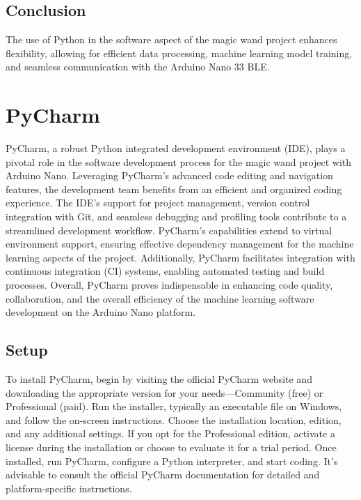 \subsection{Conclusion}
The use of Python in the software aspect of the magic wand project enhances flexibility, allowing for efficient data processing, machine learning model training, and seamless communication with the Arduino Nano 33 BLE.


\section{PyCharm}
\label{Pycharm}
PyCharm, a robust Python integrated development environment (IDE), plays a pivotal role in the software development process for the magic wand project with Arduino Nano. Leveraging PyCharm's advanced code editing and navigation features, the development team benefits from an efficient and organized coding experience. The IDE's support for project management, version control integration with Git, and seamless debugging and profiling tools contribute to a streamlined development workflow. PyCharm's capabilities extend to virtual environment support, ensuring effective dependency management for the machine learning aspects of the project. Additionally, PyCharm facilitates integration with continuous integration (CI) systems, enabling automated testing and build processes. Overall, PyCharm proves indispensable in enhancing code quality, collaboration, and the overall efficiency of the machine learning software development on the Arduino Nano platform.\cite{Learn:2021}
\subsection{Setup}
To install PyCharm, begin by visiting the official PyCharm website and downloading the appropriate version for your needs—Community (free) or Professional (paid). Run the installer, typically an executable file on Windows, and follow the on-screen instructions. Choose the installation location, edition, and any additional settings. If you opt for the Professional edition, activate a license during the installation or choose to evaluate it for a trial period. Once installed, run PyCharm, configure a Python interpreter, and start coding. It's advisable to consult the official PyCharm documentation for detailed and platform-specific instructions.
